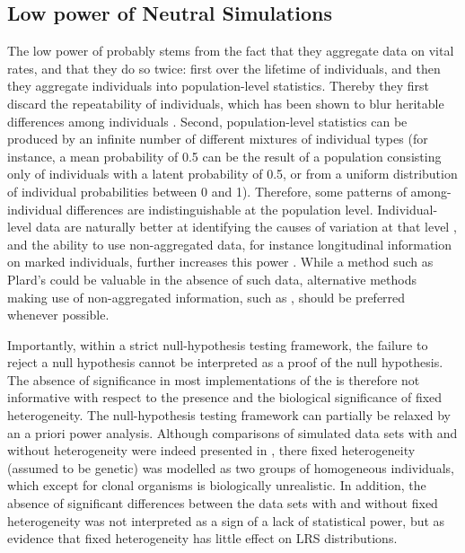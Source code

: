 \subsection{Low power of Neutral Simulations}
The low power of \NSM probably stems from the fact that they aggregate data on vital rates, and that they do so twice: first over the lifetime of individuals, and then they aggregate individuals into population-level statistics. Thereby they first discard the repeatability of individuals, which has been shown to blur heritable differences among individuals \parencite{Vaupel1988}. Second, population-level statistics can be produced by an infinite number of different mixtures of individual types (for instance, a mean probability of 0.5 can be the result of a population consisting only of individuals with a latent probability of 0.5, or from a uniform distribution of individual probabilities between 0 and 1). Therefore, some patterns of among-individual differences are indistinguishable at the population level. Individual-level data are naturally better at identifying the causes of variation at that level \parencite{Clutton-brock2010}, and the ability to use non-aggregated data, for instance longitudinal information on marked individuals, further increases this power \parencite{Brooks2013}. While a method such as Plard's \NSM could be valuable in the absence of such data, alternative methods making use of non-aggregated information, such as \MM, should be preferred whenever possible.

Importantly, within a strict null-hypothesis testing framework, the failure to reject a null hypothesis cannot be interpreted as a proof of the null hypothesis. The absence of significance in most implementations of the \NSM \parencite{Steiner2010,Orzack2011,Tuljapurkar2009,Plard2012} is therefore not informative with respect to the presence and the biological significance of fixed heterogeneity. The null-hypothesis testing framework can partially be relaxed by an a priori power analysis. Although comparisons of simulated data sets with and without heterogeneity were indeed presented in \cite{Steiner2012}, there fixed heterogeneity (assumed to be genetic) was modelled as two groups of homogeneous individuals, which except for clonal organisms is biologically unrealistic. In addition, the absence of significant differences between the data sets with and without fixed heterogeneity was not interpreted as a sign of a lack of statistical power, but as evidence that fixed heterogeneity has little effect on LRS distributions. 

